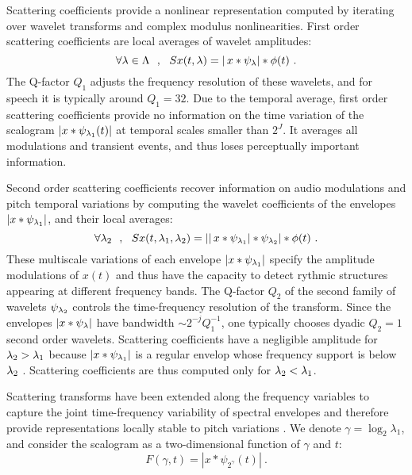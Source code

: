 Scattering coefficients provide a nonlinear representation 
computed by 
iterating over wavelet transforms and complex modulus nonlinearities. 
First order scattering coefficients
are local averages of wavelet amplitudes:
\[
\forall {\lambda} \in {\Lambda}~~,~~S x(t,{\lambda}) = |\, x \ast \psi_{\lambda}| \ast \phi(t)~. 
\]
The Q-factor $Q_1$ adjusts the frequency resolution of 
these wavelets, and for speech it is typically around $Q_1=32$.
 Due to the temporal average, first order scattering coefficients 
provide no information on the time variation of the scalogram
$|x \ast \psi_{{\lambda}_1} (t)|$ at temporal scales smaller than $2^J$. 
It averages all modulations and 
transient events, and thus loses perceptually important information.
 
Second order scattering coefficients recover information on
audio modulations and pitch temporal variations by computing
the wavelet coefficients of the envelopes $|x \ast \psi_{{\lambda}_1}|$, and their
local averages:
\[
\forall {\lambda}_2~~,~~
S x(t,{\lambda}_1,{\lambda}_2) = ||\, x \ast \psi_{{\lambda}_1}| \ast \psi_{{\lambda}_2}| \ast \phi(t)~ .
\]
These multiscale variations of each envelope $|x \ast \psi_{{\lambda}_1}|$ 
specify the amplitude modulations of $x(t)$ \cite{deepscatt} and 
thus have the capacity to detect rythmic structures appearing at different 
frequency bands. 
The Q-factor $Q_2$ of the second family of wavelets $\psi_{{\lambda}_2}$ 
controls the time-frequency resolution of the transform. 
Since the envelopes $| x \ast \psi_{\lambda}|$ have bandwidth $\sim 2^{-j} Q_1^{-1}$, 
one typically chooses dyadic $Q_2=1$ second order wavelets.
Scattering coefficients have a negligible amplitude for
${\lambda}_2 > {\lambda}_1$ because $|x \ast \psi_{{\lambda}_1}|$ is a regular envelop
whose frequency support is below ${\lambda}_2$ \cite{pami}. 
Scattering coefficients are thus computed only for ${\lambda}_2 < {\lambda}_1$. 

%
%
%
%
Scattering transforms have been extended along the frequency
variables to capture the joint time-frequency 
variability of spectral envelopes and therefore provide 
 representations locally stable to pitch variations \cite{deepscatt}. 
We denote $\gamma = \log_2 \lambda_1$, and consider
the scalogram as a two-dimensional function of $\gamma$ and $t$: 
\[
F (\gamma, t) = |x \ast \psi_{2^{\gamma}} (t)|~.
\]

